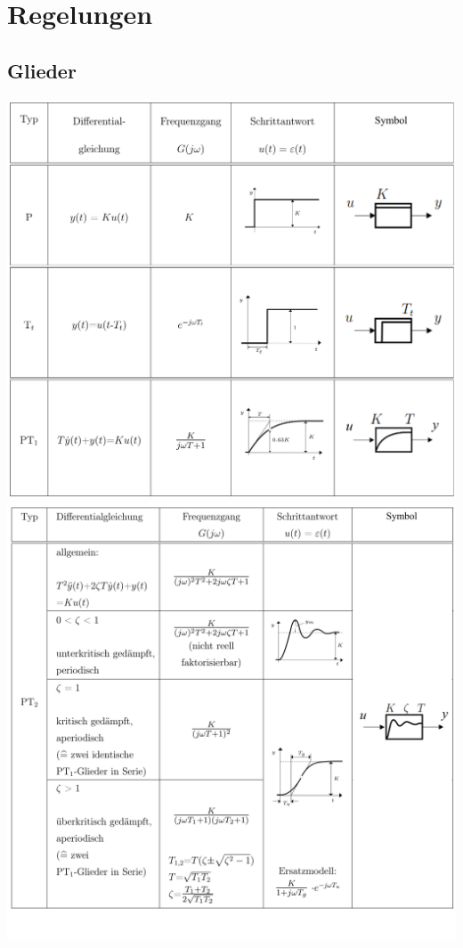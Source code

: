 \section{Regelungen}
\subsection{Glieder}
\includegraphics[width=12 cm]{./bilder/glieder1.png} \newpage
\includegraphics[width=12 cm]{./bilder/glieder2.png} \\\\
